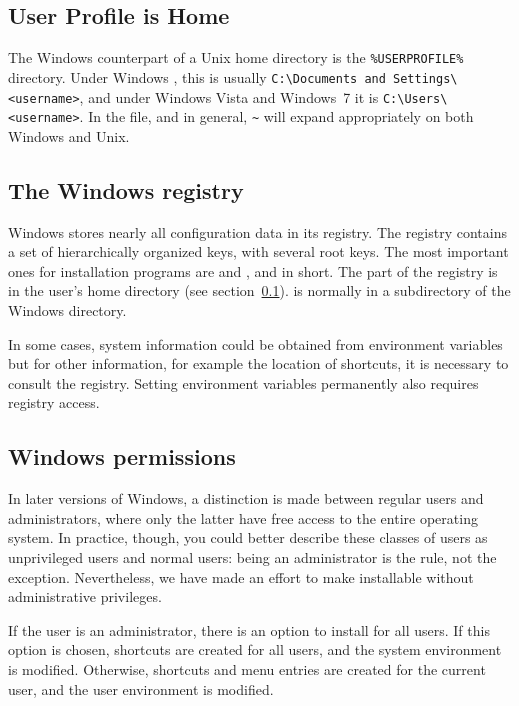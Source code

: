 \documentclass{article}
\begin{document}
\subsection{User Profile is Home}
\label{sec:winhome}

The Windows counterpart of a Unix home directory is the
\verb|%USERPROFILE%| directory.  Under Windows , this
is usually \verb|C:\Documents and Settings\<username>|, and under
Windows Vista and Windows~7 it is \verb|C:\Users\<username>|.  In the
 file, and \KPS{} in general, \verb|~| will expand
appropriately on both Windows and Unix.


\subsection{The Windows registry}
\label{sec:registry}

Windows stores nearly all configuration data in its registry.  The
registry contains a set of hierarchically organized keys, with several
root keys. The most important ones for installation programs are
 and ,  and
 in short. The  part of the registry is in the
user's home directory (see section~\ref{sec:winhome}).   is
normally in a subdirectory of the Windows directory.

In some cases, system information could be obtained from environment
variables but for other information, for example the location of
shortcuts, it is necessary to consult the registry.  Setting environment
variables permanently also requires registry access.


\subsection{Windows permissions}
\label{sec:winpermissions}

In later versions of Windows, a distinction is made between regular
users and administrators, where only the latter have free access to the
entire operating system. In practice, though, you could better describe
these classes of users as unprivileged users and normal users: being an
administrator is the rule, not the exception. Nevertheless, we have made
an effort to make \TL{} installable without administrative privileges.

If the user is an administrator, there is an option to install for all
users.  If this option is chosen, shortcuts are created for all users,
and the system environment is modified. Otherwise, shortcuts and menu
entries are created for the current user, and the user environment is
modified.
\end{document}
